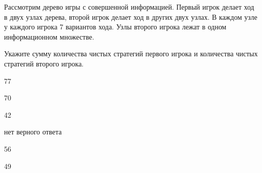 
\begin{question}
Рассмотрим дерево игры с совершенной информацией. Первый игрок делает
ход в двух узлах дерева, второй игрок делает ход в других двух узлах. В
каждом узле у каждого игрока 7 вариантов хода. Узлы второго игрока лежат
в одном информационном множестве.

Укажите сумму количества чистых стратегий первого игрока и количества
чистых стратегий второго игрока.
\begin{answerlist}
  \item 77
  \item 70
  \item 42
  \item нет верного ответа
  \item 56
  \item 49
\end{answerlist}
\end{question}


